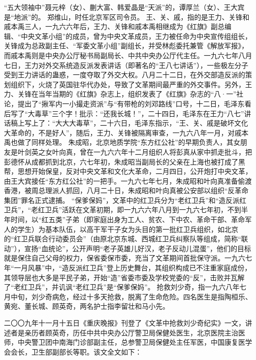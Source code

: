 \begin{maonote}
“五大领袖中”聂元梓（女）、蒯大富、韩爱晶是“天派”的，谭厚兰（女）、王大宾是“地派”的。
郑维山，时任北京军区司令员。
王、关、戚，指的是王力、关锋和戚本禹三人，一九六六年后，王力、关锋和戚本禹相继成为《红旗》副总编辑、“中央文革小组”的成员，曾为中央文革成员，王力被任命为中央宣传组组长，关锋成为总政副主任、“军委文革小组”副组长，并受林彪委托兼管《解放军报》，而戚本禹则是中央办公厅秘书局副局长、中共中央办公厅代主任。一九六七年八月七日，王力对外交系统造反派发表讲话（即著名的“王八七讲话”），一些极左分子受到王力讲话的蛊惑，一度夺取了外交大权。八月二十二日，在外交部造反派的策划组织下，火烧了英国驻华代办处，导致了文革期间最严重的外交事件。另外，王力、关锋在当年当期的《红旗》杂志上，组织发表了《红旗》杂志的“八·一”社论，提出了“揪军内一小撮走资派”与“有带枪的刘邓路线”口号，十二日，毛泽东看后写了“大毒草”三个字！批示：“还我长城！”，二十四日，毛泽东在王力“八七”讲话稿上写上了：“大大大毒草”，二十六日，毛泽东指示，“王、关、戚是破坏文化大革命的，不是好人”，随后，王力、关锋被隔离审查，一九六八年一月，对戚本禹也做了同样处理。
朱成昭，北京地质学院“东方红公社”的早期负责人，其女朋友是叶剑英之女叶向真，曾在一九六六年十二月组织人将彭真从家中抓走批斗，把彭德怀从成都抓到北京，六七年初，朱成昭当副局长的父亲在上海也被打成了黑帮，思想开始保皇，反对中央文革和文化大革命，二月四日，公开炮打中央文革，由王大宾接任“东方红公社”的一把手。一九六七年七月，朱成昭和叶向真准备偷渡香港，被周总理派人抓回，八月二十日，朱成昭和叶向真被公安部以组织“反革命集团”罪名正式逮捕。
“保爹保妈”，文革中的红卫兵分为“老红卫兵”和“造反派红卫兵”，“老红卫兵”活跃在文革初期，即一九六六年八月到一九六七年初，不到半年时间，以“红五类”子弟（即家庭出身为工人、贫农、下中农、革命干部、革命军人的学生）为基本队伍，以高干军干子女为头目的第一批红卫兵组织，如北京的“红卫兵联合行动委员会”（由原北京东城、西城红卫兵纠察队等组成，简称“联动”），宣扬“血统论”，公开声明“老子英雄儿好汉，老子反动儿混蛋”，他们的目标就是保住自己父母的权力，保省委保市委，充当了文革期间首批保守派。一九六七年“一月风暴”中，“造反派红卫兵”登上历史舞台，其组织构成已不注重家庭成份，其领导层也大多是平民子弟，开始“造”省委市委及学校党委的“反”，击败并瓦解了“老红卫兵”，并讥讽“老红卫兵”是“保爹保妈”。
抢救刘少奇，指一九六八年七月中旬，刘少奇病危，经过十多天抢救，脱离了生命危险。四名医生是指陶桓乐、黄宛、董长城、顾英奇，两名护士指李留壮和马小先。

二〇〇九年十一月十五日《重庆晚报》刊登了《文革中抢救刘少奇纪实》一文，讲述者是亲历者顾英奇，历任中共中央办公厅警卫局保健处医生，北京医院主治医师，中央警卫团中南海门诊部副主任，总参警卫局保健处主任军医，中国康复医学会会长，卫生部副部长等职。该文全文如下：


\end{maonote}

